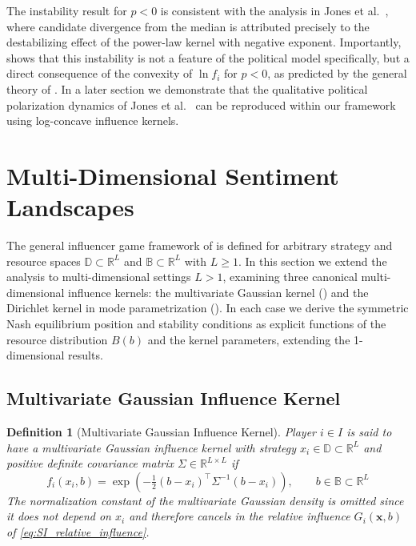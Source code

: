 \documentclass{article}
\newtheorem{definition}{Definition}
\begin{document}
            The instability result for $p < 0$ is consistent with the analysis in Jones et al.\ \cite{jones2022polarization}, where candidate divergence from the median is attributed precisely to the destabilizing effect of the power-law kernel with negative exponent. Importantly,  shows that this instability is not a feature of the political model specifically, but a direct consequence of the convexity of $\ln f_i$ for $p < 0$, as predicted by the general theory of . In a later section we demonstrate that the qualitative political polarization dynamics of Jones et al.\ \cite{jones2022polarization} can be reproduced within our framework using log-concave influence kernels.
                    
       
    \section{Multi-Dimensional Sentiment Landscapes}\label{sec:SI_multidimensional}
        The general influencer game framework of  is defined for arbitrary strategy and resource spaces $\mathbb{D} \subset \mathbb{R}^L$ and $\mathbb{B} \subset \mathbb{R}^L$ with $L \geq 1$. In this section we extend the analysis to multi-dimensional settings $L > 1$, examining three canonical multi-dimensional influence kernels: the multivariate Gaussian kernel () and the Dirichlet kernel in mode parametrization (). In each case we derive the symmetric Nash equilibrium position and stability conditions as explicit functions of the resource distribution $B(b)$ and the kernel parameters, extending the 1-dimensional results.

        \subsection{Multivariate Gaussian Influence Kernel}\label{subsec:SI_mvg}

            \begin{definition}[Multivariate Gaussian Influence Kernel]\label{def:SI_mvg_kernel}
                Player $i \in I$ is said to have a multivariate Gaussian influence kernel with strategy $x_i \in \mathbb{D} \subset \mathbb{R}^L$ and positive definite covariance matrix $\Sigma \in \mathbb{R}^{L \times L}$ if
                \begin{equation}\label{eq:SI_mvg_kernel}
                    f_i(x_i, b) = \exp\!\left(-\tfrac{1}{2}(b - x_i)^\top \Sigma^{-1} (b - x_i)\right), \qquad b \in \mathbb{B} \subset \mathbb{R}^L
                \end{equation}
                The normalization constant of the multivariate Gaussian density is omitted since it does not depend on $x_i$ and therefore cancels in the relative influence $G_i(\mathbf{x},b)$ of \cref{eq:SI_relative_influence}.
            \end{definition}
            
\end{document}
